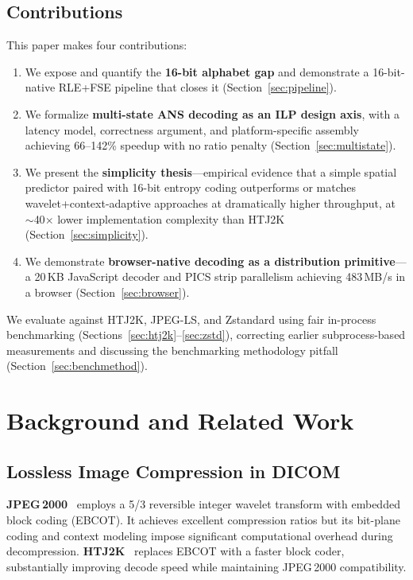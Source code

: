 \documentclass[10pt,twocolumn]{article}
\begin{document}
\subsection{Contributions}
\label{sec:contributions}

This paper makes four contributions:

\begin{enumerate}
  \item We expose and quantify the \textbf{16-bit alphabet gap} and demonstrate a 16-bit-native RLE+FSE pipeline that closes it (Section~\ref{sec:pipeline}).

  \item We formalize \textbf{multi-state ANS decoding as an ILP design axis}, with a latency model, correctness argument, and platform-specific assembly achieving 66--142\% speedup with no ratio penalty (Section~\ref{sec:multistate}).

  \item We present the \textbf{simplicity thesis}---empirical evidence that a simple spatial predictor paired with 16-bit entropy coding outperforms or matches wavelet+context-adaptive approaches at dramatically higher throughput, at $\sim$40$\times$ lower implementation complexity than HTJ2K (Section~\ref{sec:simplicity}).

  \item We demonstrate \textbf{browser-native decoding as a distribution primitive}---a 20\,KB JavaScript decoder and PICS strip parallelism achieving 483\,MB/s in a browser (Section~\ref{sec:browser}).
\end{enumerate}

We evaluate against HTJ2K, JPEG-LS, and Zstandard using fair in-process benchmarking (Sections~\ref{sec:htj2k}--\ref{sec:zstd}), correcting earlier subprocess-based measurements and discussing the benchmarking methodology pitfall (Section~\ref{sec:benchmethod}).

\section{Background and Related Work}
\label{sec:background}

\subsection{Lossless Image Compression in DICOM}

\textbf{JPEG\,2000}~\cite{jpeg2000book} employs a 5/3 reversible integer wavelet transform with embedded block coding (EBCOT). It achieves excellent compression ratios but its bit-plane coding and context modeling impose significant computational overhead during decompression. \textbf{HTJ2K}~\cite{htj2k} replaces EBCOT with a faster block coder, substantially improving decode speed while maintaining JPEG\,2000 compatibility.
\end{document}
